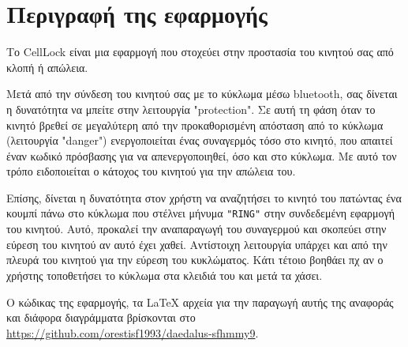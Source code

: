 \section{Περιγραφή της εφαρμογής}
Το CellLock είναι μια εφαρμογή που στοχεύει στην προστασία του κινητού σας από κλοπή ή απώλεια.

Μετά από την σύνδεση του κινητού σας με το κύκλωμα μέσω bluetooth, σας δίνεται η δυνατότητα να μπείτε στην λειτουργία "protection".
Σε αυτή τη φάση όταν το κινητό βρεθεί σε μεγαλύτερη από την προκαθορισμένη απόσταση από το κύκλωμα (λειτουργία "danger") ενεργοποιείται ένας συναγερμός τόσο στο κινητό, που απαιτεί έναν κωδικό πρόσβασης για να απενεργοποιηθεί, όσο και στο κύκλωμα.
Με αυτό τον τρόπο ειδοποιείται ο κάτοχος του κινητού για την απώλεια του.

Επίσης, δίνεται η δυνατότητα στον χρήστη να αναζητήσει το κινητό του πατώντας ένα κουμπί πάνω στο κύκλωμα που στέλνει μήνυμα \texttt{"RING"} στην συνδεδεμένη εφαρμογή του κινητού. Αυτό, προκαλεί την αναπαραγωγή του συναγερμού και σκοπεύει στην εύρεση του κινητού αν αυτό έχει χαθεί. Αντίστοιχη λειτουργία υπάρχει και από την πλευρά του κινητού για την εύρεση του κυκλώματος. Κάτι τέτοιο βοηθάει πχ αν ο χρήστης τοποθετήσει το κύκλωμα στα κλειδιά του και μετά τα χάσει.

Ο κώδικας της εφαρμογής, τα \LaTeX{} αρχεία για την παραγωγή αυτής της αναφοράς και διάφορα διαγράμματα βρίσκονται στο
\url{https://github.com/orestisf1993/daedalus-sfhmmy9}.
